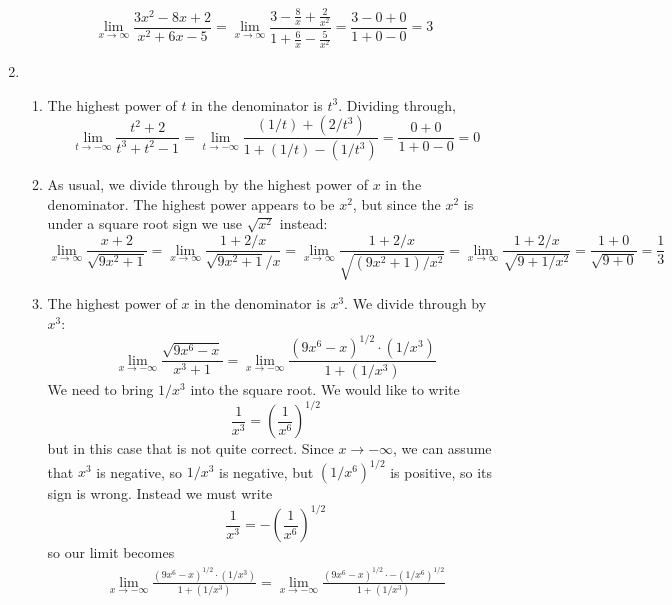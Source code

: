 \documentclass{article}
\begin{document}
\begin{enumerate}
\begin{displaymath}
    \lim_{x\to\infty} \frac{3x^2-8x+2}{x^2+6x-5}
    = \lim_{x\to\infty} \frac{3-\frac{8}{x}+\frac{2}{x^2}}{
      1+\frac{6}{x}-\frac{5}{x^2}}
    = \frac{3-0+0}{1+0-0} = 3
  \end{displaymath}
\item %
  \begin{enumerate}
  \item %
    The highest power of $t$ in the denominator is $t^3$.  Dividing through,
    \begin{equation*}
      \lim_{t\to -\infty} \frac{t^2+2}{t^3+t^2-1}
      = \lim_{t\to -\infty} \frac{(1/t)+(2/t^3)}{1+(1/t)-(1/t^3)}
      = \frac{0+0}{1+0-0}
      = 0
    \end{equation*}
  \item %
    As usual, we divide through by the highest power of $x$ in the denominator.
    The highest power appears to be $x^2$, but since the $x^2$ is under a
    square root sign we use $\sqrt{x^2}$ instead:
    \begin{equation*}
      \lim_{x\to\infty} \frac{x+2}{\sqrt{9x^2+1}}
      = \lim_{x\to\infty} \frac{1+2/x}{\sqrt{9x^2+1}/x}
      = \lim_{x\to\infty} \frac{1+2/x}{\sqrt{(9x^2+1)/x^2}}
      = \lim_{x\to\infty} \frac{1+2/x}{\sqrt{9+1/x^2}}
      = \frac{1+0}{\sqrt{9+0}}
      = \frac{1}{3}
    \end{equation*}
  \item %
    The highest power of $x$ in the denominator is $x^3$.  We divide through
    by $x^3$:
    \begin{equation*}
      \lim_{x\to -\infty} \frac{\sqrt{9x^6-x}}{x^3+1}
      = \lim_{x\to -\infty} \frac{(9x^6-x)^{1/2}\cdot (1/x^3)}{1+(1/x^3)}
    \end{equation*}
    We need to bring $1/x^3$ into the square root.  We would like to write
    \begin{equation*}
      \frac{1}{x^3} = \left(\frac{1}{x^6}\right)^{1/2}
    \end{equation*}
    but in this case that is not quite correct.  Since $x\to -\infty$, we
    can assume that $x^3$ is negative, so $1/x^3$ is negative, but 
    $(1/x^6)^{1/2}$ is positive, so its sign is wrong.  Instead we must write
    \begin{equation*}
      \frac{1}{x^3} = -\left(\frac{1}{x^6}\right)^{1/2}
    \end{equation*}
    so our limit becomes
    \begin{multline*}
      \lim_{x\to -\infty} \frac{(9x^6-x)^{1/2}\cdot (1/x^3)}{1+(1/x^3)}
      = \lim_{x\to -\infty} \frac{(9x^6-x)^{1/2}\cdot -(1/x^6)^{1/2}}{1+(1/x^3)}

\end{multline*}
\end{enumerate}
\end{enumerate}
\end{document}
